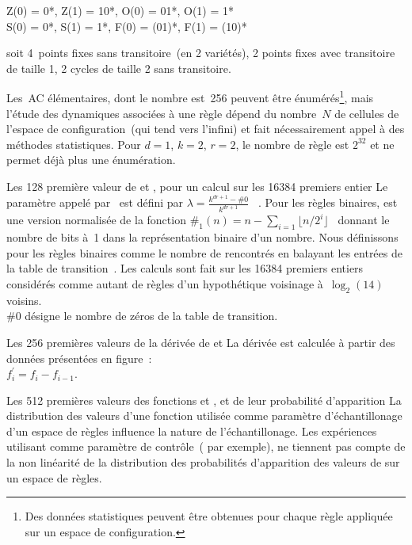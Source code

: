 \noindent Z(0) = 0*, Z(1) = 10*, O(0) = 01*, O(1) = 1*\\
S(0) = 0*, S(1) = 1*, F(0) = (01)*, F(1) = (10)*

soit 4~points fixes sans transitoire~(en 2 vari\'et\'es), 2 points fixes
avec transitoire de taille 1, 2 cycles de taille 2 sans transitoire.

Les~AC \'el\'ementaires, dont le nombre est~256 peuvent \^etre
\'enum\'er\'es\footnote{%
  Des donn\'ees statistiques peuvent \^etre obtenues pour
  chaque r\`egle appliqu\'ee sur un espace de configuration.}, %
mais l'\'etude des dynamiques associ\'ees \`a une r\`egle d\'epend du
nombre~$N$ de cellules de l'espace de configuration~(qui tend
vers l'infini) et fait n\'ecessairement appel \`a des m\'ethodes statistiques. %
Pour $d = 1$, $k = 2$, $r = 2$, le nombre de r\`egle est $2^{32}$ et ne
permet d\'ej\`a plus une \'enum\'eration.

%
{}%
{Les 128 premi\`ere valeur de \protect\alambda et \protect\Flip, pour un calcul sur les
  16384 premiers entier}%
{Le param\`etre appel\'e \alambda par~\cite{Li90b} est d\'efini par %
  $\lambda = \frac{k^{dr+1}-\#0}{k^{dr+1}}$~%
  . %
  Pour les r\`egles binaires, \alambda est une version normalis\'ee de la
  fonction $\#_{1}(n) = n - \sum_{i=1}\lfloor n/2^{i}\rfloor$~%
  \cite[]{Wolfram83} donnant le nombre de bits \`a~1 dans la
  repr\'esentation binaire d'un nombre. %
  Nous d\'efinissons \Flip pour les r\`egles binaires comme le nombre de
   rencontr\'es en balayant les entr\'ees de la table de
  transition~. %
  Les calculs sont fait sur les 16384 premiers entiers consid\'er\'es comme
  autant de r\`egles d'un hypoth\'etique voisinage \`a~$\log_{2}(14)$
  voisins.\\
  $\#0$ d\'esigne le nombre de z\'eros de la table de transition.}

%
{}%
{Les 256 premi\`eres valeurs de la d\'eriv\'ee de \protect\alambda et \protect\Flip}%
{La d\'eriv\'ee est calcul\'ee \`a partir des donn\'ees pr\'esent\'ees en
  figure~:\\ %
  $f^{\prime}_{i} = f_{i} - f_{i-1}$.}

%
{}%
{Les 512 premi\`eres valeurs des fonctions \protect\alambda et
  \protect\Flip, et de leur probabilit\'e d'apparition}%
{La distribution des valeurs d'une fonction utilis\'ee comme para\-m\`e\-tre
  d'\'echantillonage d'un espace de r\`egles influence la nature de
  l'\'echan\-til\-lonage. %
  Les exp\'eriences utilisant \alambda comme param\`etre de
  contr\^ole~(\cite{Li90b} par exemple), ne tiennent pas compte de la
  non lin\'earit\'e de la distribution des probabilit\'es d'apparition des
  valeurs de \alambda sur un espace de r\`egles.}

